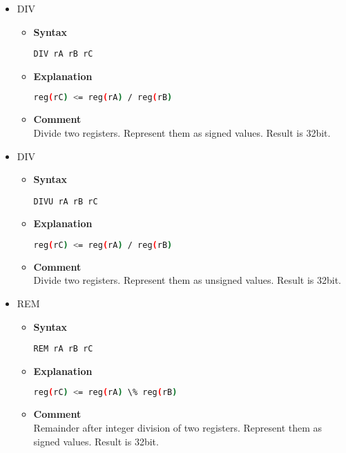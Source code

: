 \begin{itemize}
    \item DIV
    \begin{itemize}
        \item \textbf{Syntax}
        \begin{lstlisting}[language={[markII]Assembler}, frame=single]
    DIV rA rB rC
        \end{lstlisting}
        \item \textbf{Explanation}
        \begin{lstlisting}[language=bash, frame=single]
    reg(rC) <= reg(rA) / reg(rB)
        \end{lstlisting}
        \item \textbf{Comment} \\
        Divide two registers. Represent them as signed values. Result is 32bit.
    \end{itemize}

    \item DIV
    \begin{itemize}
        \item \textbf{Syntax}
        \begin{lstlisting}[language={[markII]Assembler}, frame=single]
    DIVU rA rB rC
        \end{lstlisting}
        \item \textbf{Explanation}
        \begin{lstlisting}[language=bash, frame=single]
    reg(rC) <= reg(rA) / reg(rB)
        \end{lstlisting}
        \item \textbf{Comment} \\
        Divide two registers. Represent them as unsigned values. Result is 32bit.
    \end{itemize}

    \item REM
    \begin{itemize}
        \item \textbf{Syntax}
        \begin{lstlisting}[language={[markII]Assembler}, frame=single]
    REM rA rB rC
        \end{lstlisting}
        \item \textbf{Explanation}
        \begin{lstlisting}[language=bash, frame=single]
    reg(rC) <= reg(rA) \% reg(rB)
        \end{lstlisting}
        \item \textbf{Comment} \\
        Remainder after integer division of two registers. Represent them as signed values. Result is 32bit.
    \end{itemize}


\end{itemize}
